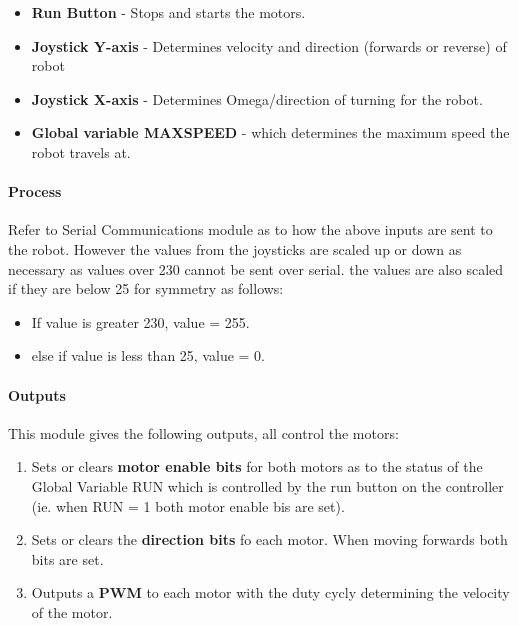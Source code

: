 \documentclass[MTRX3700report.tex]{subfiles}
\begin{document}
	\begin{itemize}
		\item \textbf{Run Button} - Stops and starts the motors.
		\item \textbf{Joystick Y-axis} - Determines velocity and direction (forwards or reverse) of robot
		\item \textbf{Joystick X-axis} - Determines Omega/direction of turning for the robot.
		\item \textbf{Global variable MAX\textunderscore SPEED}  - which determines the maximum speed the robot travels at.
	\end{itemize} 
	
	
	\paragraph{Process}
	
	Refer to Serial Communications module as to how the above inputs are sent to the robot. However the values from the joysticks are scaled up or down as necessary as values over 230 cannot be sent over serial. the values are also scaled if they are below 25 for symmetry as follows:
	
	\begin{itemize}
		\item If value is greater 230, value = 255.
		\item else if value is less than 25, value = 0.
	\end{itemize} 
	
	
	\paragraph{Outputs}
	This module gives the following outputs, all control the motors:
	
	\begin{enumerate}
		\item Sets or clears \textbf{motor enable bits} for both motors as to the status of the Global Variable RUN which is controlled by the run button on the controller (ie. when RUN = 1 both motor enable bis are set).
		\item Sets or clears the \textbf{direction bits} fo each motor. When moving forwards both bits are set.
		\item Outputs a \textbf{PWM} to each motor with the duty cycly determining the velocity of the motor.  	
	\end{enumerate} 
	
\end{document}
